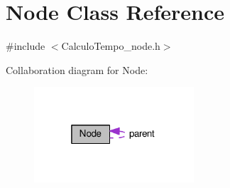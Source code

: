 \hypertarget{classNode}{}\section{Node Class Reference}
\label{classNode}


{\ttfamily \#include $<$Calculo\+Tempo\+\_\+node.\+h$>$}



Collaboration diagram for Node\+:
\nopagebreak
\begin{figure}[H]
\begin{center}
\leavevmode
\includegraphics[width=169pt]{classNode__coll__graph}
\end{center}
\end{figure}
